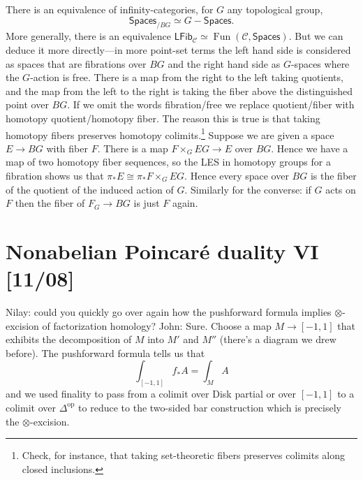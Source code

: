 \documentclass{amsart}
\DeclareMathOperator{\Fun}{Fun}
\begin{document}
\begin{remark}
    There is an equivalence of infinity-categories, for $G$ any topological group,
    \begin{equation*}
        \mathsf{Spaces}_{/BG} \simeq G-\mathsf{Spaces}.
    \end{equation*}
    More generally, there is an equivalence $\mathsf{LFib}_\mathcal{C}\simeq \Fun(\mathcal{C},\mathsf{Spaces})$.
    But we can deduce it more directly---in more point-set terms the left hand side
    is considered as spaces that are fibrations over $BG$ and the right hand side as
    $G$-spaces where the $G$-action is free. There is a map from the right to the left
    taking quotients, and the map from the left to the right is taking the fiber above
    the distinguished point over $BG$. If we omit the words fibration/free we replace
    quotient/fiber with homotopy quotient/homotopy fiber. The reason this is true is
    that taking homotopy fibers preserves homotopy colimits.\footnote{Check, for instance,
    that taking set-theoretic fibers preserves colimits along closed inclusions.}
    Suppose we are given a
    space $E\to BG$ with fiber $F$. There is a map $F\times_G EG\to E$ over $BG$. Hence
    we have a map of two homotopy fiber sequences, so the LES in homotopy groups for
    a fibration shows us that $\pi_*E\cong\pi_* F\times_GEG$. Hence every space over
    $BG$ is the fiber of the quotient of the induced action of $G$. Similarly
    for the converse: if $G$ acts on $F$ then the fiber of $F_G\to BG$ is just $F$
    again.
\end{remark}


\section{Nonabelian Poincar\'e duality VI [11/08]}

Nilay: could you quickly go over again how the pushforward formula implies
$\otimes$-excision of factorization homology?
John: Sure. Choose a map $M\to [-1,1]$ that exhibits the decomposition of $M$ into $M'$ and $M''$
(there's a diagram we drew before).
The pushforward formula tells us that
\begin{equation*}
    \int_{[-1,1]} f_*A = \int_M A
\end{equation*}
and we used finality to pass from a colimit over Disk partial or over $[-1,1]$ to
a colimit over $\Delta^\text{op}$ to reduce to the two-sided bar construction which
is precisely the $\otimes$-excision.
\end{document}
